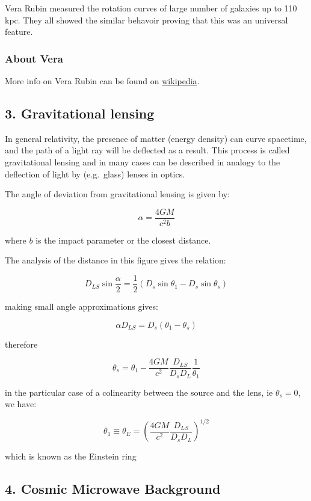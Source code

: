 \documentclass[
  letterpaper,
  DIV=11,
  numbers=noendperiod]{scrreprt}
\begin{document}
Vera Rubin measured the rotation curves of large number of galaxies up
to 110 kpc. They all showed the similar behavoir proving that this was
an universal feature.

\subsubsection{About Vera}\label{about-vera}

More info on Vera Rubin can be found on
\href{https://en.wikipedia.org/wiki/Vera_Rubin}{wikipedia}.

\subsection{3. Gravitational lensing}\label{gravitational-lensing}

In general relativity, the presence of matter (energy density) can curve
spacetime, and the path of a light ray will be deflected as a result.
This process is called gravitational lensing and in many cases can be
described in analogy to the deflection of light by (e.g.~glass) lenses
in optics.

The angle of deviation from gravitational lensing is given by:

\[\alpha = \frac{4GM}{c^2 b}\]

where \(b\) is the impact parameter or the closest distance.

The analysis of the distance in this figure gives the relation:

\[D_{LS} \sin \frac{\alpha}{2} = \frac{1}{2}(D_s \sin \theta_1 - D_s \sin \theta_s)\]

making small angle approximations gives:

\[\alpha D_{LS} = D_s (\theta_1 - \theta_s)\]

therefore

\[\theta_s = \theta_1 - \frac{4GM}{c^2}\frac{D_{LS}}{D_s D_L}\frac{1}{\theta_1}\]

in the particular case of a colinearity between the source and the lens,
ie \(\theta_s = 0\), we have:

\[\theta_1 \equiv \theta_E = \left(\frac{4GM}{c^2}\frac{D_{LS}}{D_s D_L}\right)^{1/2}\]

which is known as the Einstein ring

\subsection{4. Cosmic Microwave
Background}\label{cosmic-microwave-background-1}
\end{document}

